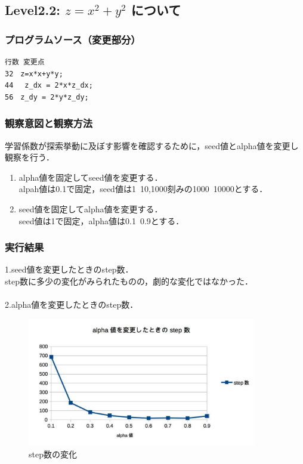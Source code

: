 \subsection{Level2.2: $z=x^2 + y^2$ について}
\subsubsection{プログラムソース（変更部分）}
\begin{breakbox}
\begin{verbatim}
行数 変更点
32　z=x*x+y*y;
44　 z_dx = 2*x*z_dx;
56　z_dy = 2*y*z_dy;
\end{verbatim}
\end{breakbox}

\subsubsection{観察意図と観察方法}

学習係数が探索挙動に及ぼす影響を確認するために，seed値とalpha値を変更し観察を行う．\\

\begin{enumerate}
\item alpha値を固定してseed値を変更する．\\
alpah値は0.1で固定，seed値は1~10,1000刻みの1000~10000とする．
\item seed値を固定してalpha値を変更する．\\
seed値は1で固定，alpha値は0.1~0.9とする．
\end{enumerate}

\subsubsection{実行結果}


1.seed値を変更したときのstep数．\\
step数に多少の変化がみられたものの，劇的な変化ではなかった．\\\\

2.alpha値を変更したときのstep数．\\
\begin{figure}[h]
 \begin{center}
  \includegraphics[width=10.0cm]{figs/level2.2/2.2alpha.pdf}
  \caption{step数の変化}
	\label{step_alpha}
 \end{center}
\end{figure}


